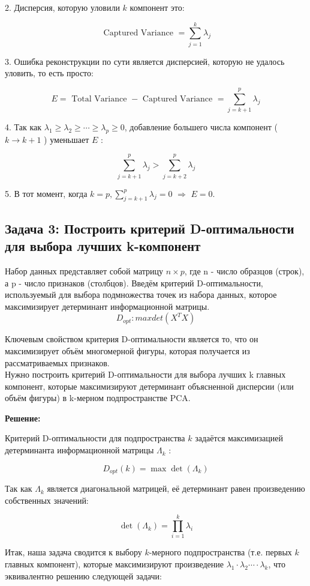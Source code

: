 2. Дисперсия, которую уловили $k$ компонент это:

$$
    \text { Captured Variance }=\sum_{j=1}^k \lambda_j
$$

3. Ошибка реконструкции по сути является дисперсией, которую не удалось уловить, то есть просто:

$$
    E=\text { Total Variance }- \text { Captured Variance }=\sum_{j=k+1}^p \lambda_j
$$

4. Так как $\lambda_1 \geq \lambda_2 \geq \cdots \geq \lambda_p \geq 0$, добавление большего числа компонент ( $k \rightarrow k+1$ ) уменьшает $E$ :

$$
    \sum_{j=k+1}^p \lambda_j>\sum_{j=k+2}^p \lambda_j
$$

5. В тот момент, когда $k=p, \sum_{j=k+1}^p \lambda_j=0$ $\Rightarrow$ $E=0$.

\subsection{Задача 3: Построить критерий D-оптимальности для выбора лучших k-компонент }
Набор данных представляет собой матрицу $n \times p$, где n - число образцов (строк), а p - число признаков (столбцов). Введём критерий D-оптимальности, используемый для выбора подмножества точек из набора данных, которое максимизирует детерминант информационной матрицы.
$$
    D_{opt} : max  det(X^{T}X)
$$

Ключевым свойством критерия D-оптимальности является то, что он максимизирует объём многомерной фигуры, которая получается из рассматриваемых признаков. \\
Нужно построить критерий D-оптимальности для выбора лучших
k главных компонент, которые максимизируют детерминант объясненной дисперсии (или объём фигуры) в k-мерном подпространстве PCA.

\textbf{Решение:}

Критерий D-оптимальности для подпространства $k$ задаётся максимизацией детерминанта информационной матрицы $\Lambda_k$ :

$$
    D_{o p t}(k)=\max \operatorname{det}\left(\Lambda_k\right)
$$

Так как $\Lambda_k$ является диагональной матрицей, её детерминант равен произведению собственных значений:

$$
    \operatorname{det}\left(\Lambda_k\right)=\prod_{i=1}^k \lambda_i
$$

Итак, наша задача сводится к выбору $k$-мерного подпространства (т.е. первых $k$ главных компонент), которые максимизируют произведение $\lambda_1 \cdot \lambda_2 \cdots \cdot \lambda_k$, что эквивалентно решению следующей задачи:

